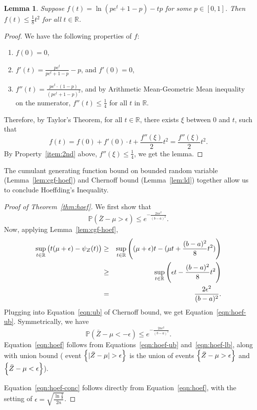 \documentclass{article}
\newtheorem{lemma}{Lemma}
\newcommand{\RR}{\mathbb{R}} %
\newcommand{\PP}{\mathbb{P}} %
\begin{document}
\begin{lemma}
Suppose $f(t) = \ln( p e^{t} + 1-p ) - tp$ for some $p \in [0,1]$.
Then $f(t) \leq \frac{1}{8} t^2$ for all $t \in \RR$.
\label{lem:cgf-bern}
\end{lemma}
\begin{proof}
  We have the following properties of $f$:
\begin{enumerate}
\item $f(0) = 0$,
\item $f'(t) = \frac{p e^t}{p e^{t} + 1-p} - p$, and $f'(0) = 0$,
\item $f''(t) = \frac{p e^t \cdot (1-p)}{(p e^{t} + 1-p)^2}$, and by Arithmetic Mean-Geometric Mean inequality on the numerator, $f''(t) \leq \frac 1 4$ for all $t$ in $\RR$.
\label{item:2nd}
\end{enumerate}
Therefore, by Taylor's Theorem, for all $t \in \RR$, there exists $\xi$ between
$0$ and $t$, such that
\[ f(t) = f(0) + f'(0) \cdot t + \frac{f''(\xi)}{2} t^2 = \frac{f''(\xi)}{2} t^2. \]
By Property~\ref{item:2nd} above, $f''(\xi) \leq \frac 1 4$, we get the lemma.
\end{proof}

The cumulant generating function bound on bounded random variable (Lemma~\ref{lem:cgf-hoef}) and Chernoff bound (Lemma~\ref{lem:ld}) together allow us to conclude Hoeffding's Inequality.
\begin{proof}[Proof of Theorem~\ref{thm:hoef}]
We first show that
\begin{equation}
  \PP( \bar{Z} - \mu > \epsilon ) \leq e^{-\frac{2n\epsilon^2}{(b-a)^2}}.
  \label{eqn:hoef-ub}
\end{equation}
Now, applying Lemma~\ref{lem:cgf-hoef},
\begin{eqnarray*}
  \sup_{t \in \RR} \del{t (\mu+\epsilon) - \psi_Z(t)}
  &\geq& \sup_{t \in \RR}  \del{(\mu+\epsilon) t - (\mu t + \frac{(b-a)^2}{8} t^2)} \\
  &\geq& \sup_{t \in \RR} \del{\epsilon t - \frac{(b-a)^2}{8} t^2} \\
  &=& \frac{2 \epsilon^2}{(b-a)^2}.
\end{eqnarray*}
Plugging into Equation~\eqref{eqn:ub} of Chernoff bound, we get Equation~\eqref{eqn:hoef-ub}.
Symmetrically, we have
\begin{equation}
  \PP( \bar{Z} - \mu < -\epsilon ) \leq e^{-\frac{2n\epsilon^2}{(b-a)^2}}.
  \label{eqn:hoef-lb}
\end{equation}
Equation~\eqref{eqn:hoef} follows from Equations~\ref{eqn:hoef-ub} and~\eqref{eqn:hoef-lb}, along with union bound ( event
$\cbr{|\bar{Z} - \mu| > \epsilon}$ is the union of events $\cbr{\bar{Z} - \mu > \epsilon}$
and $\cbr{\bar{Z} - \mu < \epsilon}$).

Equation~\eqref{eqn:hoef-conc} follows directly from Equation~\eqref{eqn:hoef},
with the setting of $\epsilon = \sqrt{\frac{\ln\frac{2}{\delta}}{2n}}$.
\end{proof}
\end{document}
